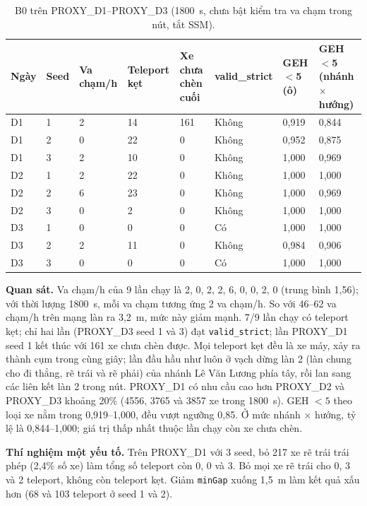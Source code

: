 \documentclass[../main.tex]{subfiles}
\begin{document}
\begin{table}[H]
\centering
\small\setlength{\tabcolsep}{3pt}
\caption{B0 trên PROXY\_D1--PROXY\_D3 (1800~s, chưa bật kiểm tra va chạm trong nút, tắt SSM).} \label{table:4.b0}
\begin{tabular}{|p{1.3cm}|p{0.9cm}|p{1.5cm}|p{1.6cm}|p{1.8cm}|p{1.8cm}|p{1.6cm}|p{1.7cm}|}
\hline
\textbf{Ngày} & \textbf{Seed} & \textbf{Va chạm/h} & \textbf{Teleport kẹt} & \textbf{Xe chưa chèn cuối} & \textbf{valid\_\allowbreak strict} & \textbf{GEH$<$5 (ô)} & \textbf{GEH$<$5 (nhánh $\times$ hướng)} \\ \hline
D1 & 1 & 2 & 14 & 161 & Không & 0,919 & 0,844 \\ \hline
D1 & 2 & 0 & 22 & 0 & Không & 0,952 & 0,875 \\ \hline
D1 & 3 & 2 & 10 & 0 & Không & 1,000 & 0,969 \\ \hline
D2 & 1 & 2 & 22 & 0 & Không & 1,000 & 1,000 \\ \hline
D2 & 2 & 6 & 23 & 0 & Không & 1,000 & 0,969 \\ \hline
D2 & 3 & 0 & 2 & 0 & Không & 1,000 & 1,000 \\ \hline
D3 & 1 & 0 & 0 & 0 & Có & 1,000 & 1,000 \\ \hline
D3 & 2 & 2 & 11 & 0 & Không & 0,984 & 0,906 \\ \hline
D3 & 3 & 0 & 0 & 0 & Có & 1,000 & 1,000 \\ \hline
\end{tabular}
\end{table}

\textbf{Quan sát.} Va chạm/h của 9 lần chạy là 2, 0, 2, 2, 6, 0, 0, 2, 0 (trung bình 1,56); với thời lượng 1800~s, mỗi va chạm tương ứng 2 va chạm/h. So với 46--62 va chạm/h trên mạng làn ra 3,2~m, mức này giảm mạnh. 7/9 lần chạy có teleport kẹt; chỉ hai lần (PROXY\_D3 seed 1 và 3) đạt \texttt{valid\_strict}; lần PROXY\_D1 seed 1 kết thúc với 161 xe chưa chèn được. Mọi teleport kẹt đều là xe máy, xảy ra thành cụm trong cùng giây; lần đầu hầu như luôn ở vạch dừng làn 2 (làn chung cho đi thẳng, rẽ trái và rẽ phải) của nhánh Lê Văn Lương phía tây, rồi lan sang các liên kết làn 2 trong nút. PROXY\_D1 có nhu cầu cao hơn PROXY\_D2 và PROXY\_D3 khoảng 20\% (4556, 3765 và 3857 xe trong 1800~s). GEH $<5$ theo loại xe nằm trong 0,919--1,000, đều vượt ngưỡng 0,85. Ở mức nhánh $\times$ hướng, tỷ lệ là 0,844--1,000; giá trị thấp nhất thuộc lần chạy còn xe chưa chèn.

\textbf{Thí nghiệm một yếu tố.} Trên PROXY\_D1 với 3 seed, bỏ 217 xe rẽ trái trái phép (2,4\% số xe) làm tổng số teleport còn 0, 0 và 3. Bỏ mọi xe rẽ trái cho 0, 3 và 2 teleport, không còn teleport kẹt. Giảm \texttt{minGap} xuống 1,5~m làm kết quả xấu hơn (68 và 103 teleport ở seed 1 và 2).
\end{document}
